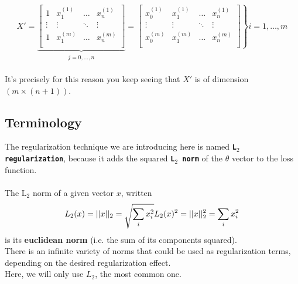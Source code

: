 $$
X' =
\underbrace{
\begin{bmatrix}
1 & x_1^{(1)} & \dots & x_n^{(1)} \\
\vdots & \vdots & \ddots & \vdots \\ 
1 & x_1^{(m)} & \dots & x_n^{(m)} \\ 
\end{bmatrix}  
}_{\begin{matrix}
    j = 0, \dots, n
\end{matrix}}
=     
\left.
\begin{bmatrix}
x_0^{(1)} & x_1^{(1)} & \dots & x_n^{(1)} \\
\vdots & \vdots & \ddots & \vdots \\ 
x_0^{(m)} & x_1^{(m)} & \dots & x_n^{(m)} \\ 
\end{bmatrix}
\right\} i = 1, \dots, m
$$
\\
It's precisely for this reason you keep seeing that $X'$ is of dimension $(m \times (n+1))$.

\subsection*{Terminology}
The regularization technique we are introducing here is named \texttt{\textbf{L$_2$ regularization}}, 
because it adds the squared \texttt{\textbf{L$_2$ norm}} of the $\theta$ vector to the loss function.\\
\\
The L$_2$ norm of a given vector $x$, written\\
$$
L_2(x) = ||x||_2 = \sqrt{\sum_i x_i^2} \\
L_2(x)^2 = ||x||_2^2 = \sum_i x_i^2
$$
is its \textbf{euclidean norm} (i.e. the sum of its components squared).\\  

\newpage
There is an infinite variety of norms that could be used as regularization terms, depending on
 the desired regularization effect.\\
Here, we will only use $L_2$, the most common one.



